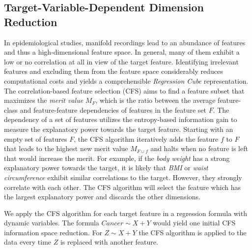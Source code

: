 \documentclass[journal]{style/vgtc} 			          %
\newcommand{\com}[1]{\textcolor{orange}{\uline{#1}}}
\begin{document}
\subsection{Target-Variable-Dependent Dimension Reduction}
In epidemiological studies, manifold recordings lead to an abundance of features and thus a high-dimensional feature space.
In general, many of them exhibit a low or no correlation at all in view of the target feature.
Identifying irrelevant features and excluding them from the feature space considerably reduces computational costs and yields a comprehensible \emph{Regression Cube} representation.
The correlation-based feature selection (CFS) \cite{CFS} aims to find a feature subset that maximizes the \emph{merit value} $M_F$, which is the ratio between the average feature-class and feature-feature dependencies of features in the feature set $F$.
The dependency of a set of features utilizes the entropy-based information gain to measure the explanatory power towards the target feature.
Starting with an empty set of features $F$, the CFS algorithm iteratively adds the feature $f$ to $F$ that leads to the highest new merit value $M_{F\cup f}$ and halts when no feature is left that would increase the merit.
For example, if the \emph{body weight} has a strong explanatory power towards the target, it is likely that \emph{BMI} or \emph{waist circumference} exhibit similar correlations to the target.
However, they strongly correlate with each other.
The CFS algorithm will select the feature which has the largest explanatory power and discards the other dimensions.

We apply the CFS algorithm for each target feature in a regression formula with dynamic variables.
The formula $Cancer \sim X + Y$ would yield one initial CFS information space reduction.
For $Z \sim X + Y$ the CFS algorithm is applied to the data every time $Z$ is replaced with another feature.
\end{document}
